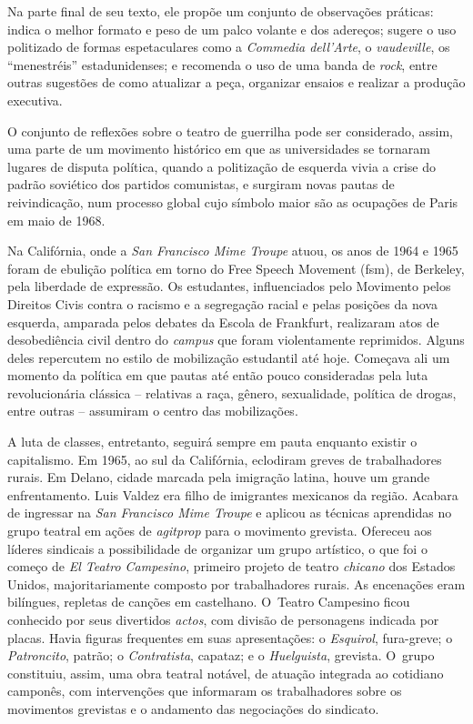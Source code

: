 {Na parte final de seu texto, ele propõe um conjunto de observações
práticas: indica o melhor formato e peso de um palco volante e dos
adereços; sugere o uso politizado de formas espetaculares como a
{\it Commedia dell'Arte}, o {\it vaudeville}, os “menestréis”
estadunidenses; e recomenda o uso de uma banda de {\it rock}, entre
outras sugestões de como atualizar a peça, organizar ensaios e
realizar a produção executiva.

O conjunto de reflexões sobre o teatro de guerrilha pode ser
considerado, assim, uma parte de um movimento histórico em que as
universidades se tornaram lugares de disputa política, quando a
politização de esquerda vivia a crise do padrão soviético dos partidos
comunistas, e surgiram novas pautas de reivindicação, num processo
global cujo símbolo maior são as ocupações de Paris em maio de 1968.

Na Califórnia, onde a {\it San Francisco Mime Troupe} atuou, os anos de
1964 e 1965 foram de ebulição política em torno do Free Speech
Movement ({\sc fsm}), de Berkeley, pela liberdade de expressão. Os estudantes,
influenciados pelo Movimento pelos Direitos Civis contra o racismo e a
segregação racial e pelas posições da nova esquerda, amparada pelos
debates da Escola de Frankfurt, realizaram atos de desobediência civil
dentro do {\it campus} que foram violentamente reprimidos. Alguns deles
repercutem no estilo de mobilização estudantil até hoje. Começava ali um
momento da política em que pautas até então pouco consideradas pela luta
revolucionária clássica -- relativas a raça, gênero, sexualidade,
política de drogas, entre outras -- assumiram o centro das mobilizações.


A luta de classes, entretanto, seguirá sempre em pauta enquanto existir
o capitalismo. Em 1965, ao sul da Califórnia, eclodiram greves de
trabalhadores rurais. Em Delano, cidade marcada pela imigração latina,
houve um grande enfrentamento. Luis Valdez era filho de imigrantes
mexicanos da região. Acabara de ingressar na {\it San Francisco Mime
Troupe} e aplicou as técnicas aprendidas no grupo teatral em ações de
{\it agitprop} para o movimento grevista. Ofereceu aos líderes sindicais
a possibilidade de organizar um grupo artístico, o que foi o começo de
{\it El Teatro Campesino}, primeiro projeto de teatro {\it chicano} dos
Estados Unidos, majoritariamente composto por trabalhadores rurais. As
encenações eram bilíngues, repletas de canções em castelhano. O~Teatro
Campesino ficou conhecido por seus divertidos {\it actos}, com divisão
de personagens indicada por placas. Havia figuras frequentes em suas
apresentações: o {\it Esquirol}, fura-greve; o {\it Patroncito}, patrão; o
{\it Contratista}, capataz; e o {\it Huelguista}, grevista. O~grupo
constituiu, assim, uma obra teatral notável, de atuação integrada ao
cotidiano camponês, com intervenções que informaram os trabalhadores
sobre os movimentos grevistas e o andamento das negociações do
sindicato.

}
